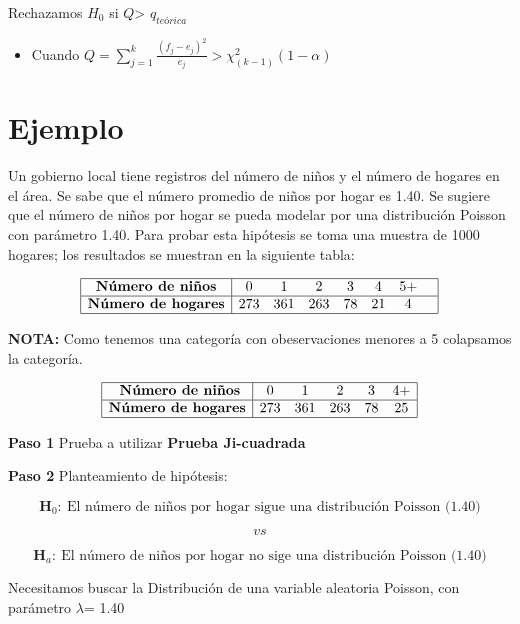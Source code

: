 \documentclass[
  a4paper,
  oneside,
  openany]{book}
\providecommand{\tightlist}{%
  \setlength{\itemsep}{0pt}\setlength{\parskip}{0pt}}
\begin{document}
Rechazamos \(H_0\) si \(Q\)\textgreater{} \(q_{teórica}\)

\begin{itemize}
\tightlist
\item
  Cuando \(Q= \sum_{j=1}^{k}\frac{(f_{j}-e_{j})^2}{e_{j}} > \chi^2_{(k-1)}(1-\alpha)\)
\end{itemize}

\hypertarget{ejemplo-11}{%
\section{Ejemplo}\label{ejemplo-11}}

Un gobierno local tiene registros del número de niños y el número de hogares en el área. Se sabe que el número promedio de niños por hogar es 1.40. Se sugiere que el número de niños por hogar se pueda modelar por una distribución Poisson con parámetro 1.40.
Para probar esta hipótesis se toma una muestra de 1000 hogares; los resultados se muestran en la siguiente tabla:

\[
\begin{array}{|c |c c c c c c c|}
\hline
\textbf{Número de niños} &0 &1 &2& 3&4 &5+& \\
\hline
\textbf{Número de hogares} & 273& 361&263 &78 & 21 & 4& \\
\hline
\end{array}
\]

\textbf{NOTA:} Como tenemos una categoría con obeservaciones menores a 5 colapsamos la categoría.

\[
\begin{array}{|c |c c c c c|}
\hline
\textbf{  Número de niños} &0 &1 &2& 3&4+  \\
\hline
\textbf{Número de hogares} & 273& 361&263 &78 & 25  \\
\hline
\end{array}
\]

\textbf{Paso 1} Prueba a utilizar \textbf{Prueba Ji-cuadrada}

\textbf{Paso 2} Planteamiento de hipótesis:

\[\textbf{H}_0: \ \mbox{El número de niños por hogar sigue una distribución Poisson (1.40)}\]

\[vs\]

\[\textbf{H}_a: \ \mbox{El número de niños por hogar no sige una distribución Poisson (1.40)}\]

Necesitamos buscar la Distribución de una variable aleatoria Poisson, con parámetro \(\lambda\)= 1.40
\end{document}
